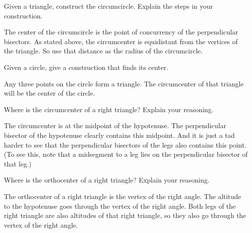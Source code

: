 \documentclass[nooutcomes]{ximera}
\begin{document}
\begin{problem}
Given a triangle, construct the circumcircle. Explain the steps
  in your construction.
\begin{freeResponse}
\begin{hint}
The center of the circumcircle is the point of concurrency of the perpendicular bisectors.  As stated above, the circumcenter is equidistant from the vertices of the triangle.  So use that distance as the radius of the circumcircle.  
\end{hint}
\end{freeResponse}
\end{problem}

\begin{problem}
Given a circle, give a construction that finds its center. 
\begin{freeResponse}
\begin{hint}
Any three points on the circle form a triangle.  The circumcenter of that triangle will be the center of the circle.  
\end{hint}
\end{freeResponse}
\end{problem}

\begin{problem}
Where is the circumcenter of a right triangle? Explain your
  reasoning.
\begin{freeResponse}
\begin{hint}
The circumcenter is at the midpoint of the hypotenuse.  The perpendicular bisector of the hypotenuse clearly contains this midpoint.  And it is just a tad harder to see that the perpendicular bisectors of the legs also contains this point.  (To see this, note that a midsegment to a leg lies on the perpendicular bisector of that leg.)
\end{hint}
\end{freeResponse}
\end{problem}

\begin{problem}
Where is the orthocenter of a right triangle? Explain your
  reasoning.
\begin{freeResponse}
\begin{hint}
The orthocenter of a right triangle is the vertex of the right angle.  The altitude to the hypotenuse goes through the vertex of the right angle.  Both legs of the right triangle are also altitudes of that right triangle, so they also go through the vertex of the right angle.  
\end{hint}
\end{freeResponse}
\end{problem}
\end{document}
